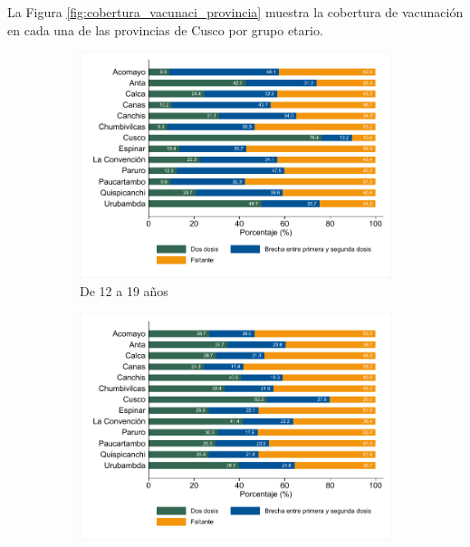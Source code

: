 \documentclass[12pt,a4paper,openany]{book}
\begin{document}
La Figura \ref{fig:cobertura_vacunaci_provincia}  muestra la cobertura de vacunación en cada una de las provincias de Cusco por grupo etario.  

\begin{figure}[h]
	\caption{Cobertura de vacunación por provincia y por Grupo Etario en la Región Cusco, hasta la SE 43. }
	\label{fig:cobertura_vacunaci_provincia}
	\centering
	\begin{subfigure}[b]{0.45\textwidth}
		\centering
		\includegraphics[width=\textwidth]{../figuras/vacunacion_provincial_edad_1}
		\caption{ De 12 a 19 años}
	\end{subfigure}
	\hfill
	\begin{subfigure}[b]{0.45\textwidth}
		\centering
		\includegraphics[width=\textwidth]{../figuras/vacunacion_provincial_edad_2}

\end{subfigure}
\end{figure}
\end{document}

